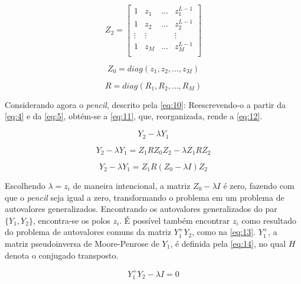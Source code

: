\documentclass[12pt]{article}
\begin{document}
\begin{equation} \label{eq:7}
    Z_2 = \begin{bmatrix} 1 & z_1 & \dots & z_1^{L-1} \\
                            1 & z_2 & \dots & z_2^{L-1} \\
                            \vdots & \vdots & & \vdots \\
                            1 & z_M & \dots & z_M^{L-1} \\
    \end{bmatrix}
\end{equation}

\begin{equation} \label{eq:8}
    Z_0 = diag(z_1, z_2, \dots, z_M)
\end{equation}

\begin{equation} \label{eq:9}
    R = diag(R_1, R_2, \dots, R_M)
\end{equation}

Considerando agora o \textit{pencil}, descrito pela \autoref{eq:10}: Reescrevendo-o a partir da \autoref{eq:4} e da \autoref{eq:5}, obtém-se a \autoref{eq:11}, que, reorganizada, 
rende a \autoref{eq:12}.

\begin{equation} \label{eq:10}
    Y_2 - \lambda Y_1
\end{equation}

\begin{equation} \label{eq:11}
    Y_2 - \lambda Y_1 = Z_1 R Z_0 Z_2 - \lambda Z_1 R Z_2
\end{equation}

\begin{equation} \label{eq:12}
    Y_2 - \lambda Y_1 = Z_1 R (Z_0 - \lambda I) Z_2
\end{equation}

Escolhendo $\lambda = z_i$ de maneira intencional, a matriz $Z_0 - \lambda I$ é zero, fazendo com que o \textit{pencil} seja igual a zero, transformando o problema em um problema de autovalores generalizados. 
Encontrando os autovalores generalizados do par $\{Y_1, Y_2\}$, encontra-se os polos $z_i$. É possível também encontrar $z_i$ como resultado do problema de autovalores comuns da matriz $Y_1^+ Y_2$, como na
\autoref{eq:13}. $Y_1^+$, a matriz pseudoinversa de Moore-Penrose de $Y_1$, é definida pela \autoref{eq:14}, no qual $H$ denota o conjugado transposto. 

\begin{equation} \label{eq:13}
    Y_1^+ Y_2 - \lambda I = 0
\end{equation}
\end{document}
